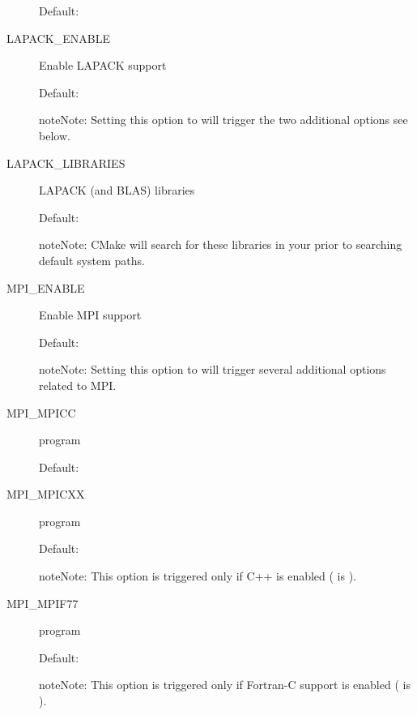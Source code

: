 \documentclass[letterpaper,10pt,english]{sphinxmanual}
\begin{document}
\begin{description}
Default: 

\item[{\index{LAPACK\_ENABLE (CMake option)}LAPACK\_ENABLE}] \leavevmode
Enable LAPACK support

Default: 

\begin{notice}{note}{Note:}
Setting this option to  will trigger the two additional
options see below.
\end{notice}

\item[{\index{LAPACK\_LIBRARIES (CMake option)}LAPACK\_LIBRARIES}] \leavevmode
LAPACK (and BLAS) libraries

Default: 

\begin{notice}{note}{Note:}
CMake will search for these libraries in your
 prior to searching default system
paths.
\end{notice}

\item[{\index{MPI\_ENABLE (CMake option)}MPI\_ENABLE}] \leavevmode
Enable MPI support

Default: 

\begin{notice}{note}{Note:}
Setting this option to  will trigger several additional
options related to MPI.
\end{notice}

\item[{\index{MPI\_MPICC (CMake option)}MPI\_MPICC}] \leavevmode
{} program

Default:

\item[{\index{MPI\_MPICXX (CMake option)}MPI\_MPICXX}] \leavevmode
{} program

Default:

\begin{notice}{note}{Note:}
This option is triggered only if C++ is enabled
( is ).
\end{notice}

\item[{\index{MPI\_MPIF77 (CMake option)}MPI\_MPIF77}] \leavevmode
{} program

Default:

\begin{notice}{note}{Note:}
This option is triggered only if Fortran-C support is enabled
( is ).
\end{notice}


\end{description}
\end{document}
